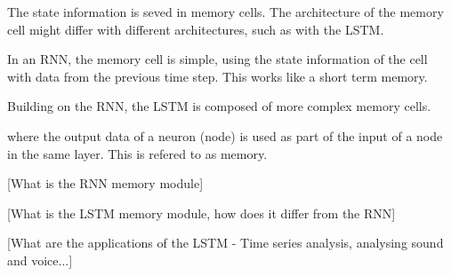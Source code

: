 The state information is seved in memory cells.
The architecture of the memory cell might differ with different architectures, such as with the LSTM.

In an RNN, the memory cell is simple, using the state information of the cell with data from the previous time step.
This works like a short term memory.

Building on the RNN, the LSTM is composed of more complex memory cells.



where the output data of a neuron (node) is used as part of the input of a node in the same layer.
This is refered to as memory.

[What is the RNN memory module]

[What is the LSTM memory module, how does it differ from the RNN]

[What are the applications of the LSTM - Time series analysis, analysing sound and voice...]

\fi
